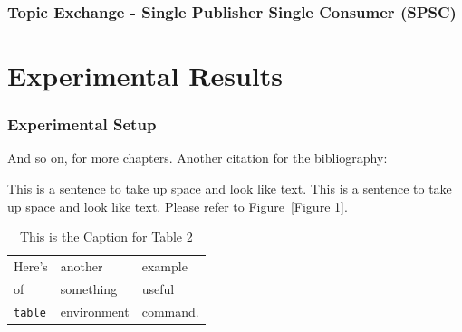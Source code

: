 \documentclass{thesis}
\begin{document}
\subsection{Topic Exchange - Single Publisher Single Consumer (SPSC)}


\chapter{Experimental Results}
\subsection{Experimental Setup}
And so on, for more chapters.
Another citation for the bibliography:\cite{anotherbook}

   This is a sentence to take up space and look like text.
   This is a sentence to take up space and look like text.
   Please refer to Figure~\ref{Figure 1}.  %

\begin{table}
\caption{This is the Caption for Table 2}
\label{mytable}
\begin{center}
\begin{tabular}{lll}
Here's	& another 	& example \\
of		& something	& useful \\
\verb+table+ & environment & command. \end{tabular}
\end{center}
\end{table}
\end{document}
